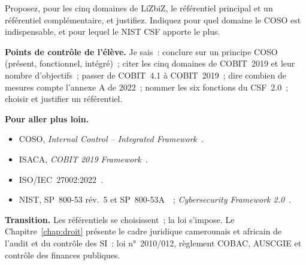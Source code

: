 \begin{boxexo}[title={\ding{45}\quad Exercice~14.10. Un référentiel pour LiZbiZ \niveauexpert}]
Proposez, pour les cinq domaines de LiZbiZ, le référentiel principal et
un référentiel complémentaire, et justifiez. Indiquez pour quel domaine le
COSO est indispensable, et pour lequel le NIST CSF apporte le plus.
\end{boxexo}

\bigskip

\begin{boxinfo}
\textbf{Points de contrôle de l'élève.} Je sais~: conclure sur un
principe COSO (présent, fonctionnel, intégré)~; citer les cinq domaines de
COBIT~2019 et leur nombre d'objectifs~; passer de COBIT~4.1 à COBIT~2019~;
dire combien de mesures compte l'annexe A de 2022~; nommer les six
fonctions du CSF~2.0~; choisir et justifier un référentiel.
\end{boxinfo}

\begin{boxinfo}
\textbf{Pour aller plus loin.}
\begin{itemize}
    \item COSO, \textit{Internal Control -- Integrated
          Framework}~\cite{coso2013ic}.
    \item ISACA, \textit{COBIT 2019 Framework}~\cite{isaca2018cobitintro,isaca2018cobitobjectifs}.
    \item ISO/IEC~27002:2022~\cite{iso27002_2022}.
    \item NIST, SP~800-53 rév.~5 et SP~800-53A~\cite{nist2020sp80053,nist2022sp80053a}~;
          \textit{Cybersecurity Framework 2.0}~\cite{nist2024csf}.
\end{itemize}
\end{boxinfo}

\begin{boxinfo}
\textbf{Transition.} Les référentiels se choisissent~; la loi s'impose. Le
Chapitre~\ref{chap:droit} présente le cadre juridique camerounais et
africain de l'audit et du contrôle des SI~: loi n°~2010/012, règlement
COBAC, AUSCGIE et contrôle des finances publiques.
\end{boxinfo}
